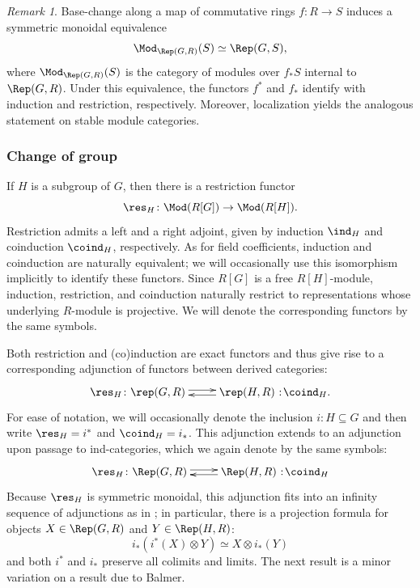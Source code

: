 \documentclass{amsart}%
\numberwithin{equation}{section}%
\theoremstyle{remark}
\newtheorem{Rem}[equation]{Remark}
\newcommand\noloc{%
  \nobreak
  \mspace{6mu plus 1mu}
  {:}
  \nonscript\mkern-\thinmuskip
  \mathpunct{}
  \mspace{2mu}
}
\begin{document}
\begin{Rem}\label{rem:etalecoeffbasechange}
Base-change along a map of commutative rings $f\colon R \to S$ induces a symmetric monoidal equivalence
\[
\Mod_{\Rep(G,R)}(S) \simeq \Rep(G,S),
\]
where $\Mod_{\Rep(G,R)}(S)$ is the category of modules over $f_*S$ internal to $\Rep(G,R)$. Under this equivalence, the functors $f^*$ and $f_*$ identify with induction and restriction, respectively. Moreover, localization yields the analogous statement on stable module categories. 
\end{Rem}


\subsubsection{Change of group}\label{ssec:changeofgroups}

If $H$ is a subgroup of $G$, then there is a restriction functor 
\[
\res_H\colon \Mod(R[G]) \to \Mod(R[H]).
\]
Restriction admits a left and a right adjoint, given by induction $\ind_H$ and coinduction $\coind_H$, respectively. As for field coefficients, induction and coinduction are naturally equivalent; we will occasionally use this isomorphism implicitly to identify these functors. Since $R[G]$ is a free $R[H]$-module, induction, restriction, and coinduction naturally restrict to representations whose underlying $R$-module is projective. We will denote the corresponding functors by the same symbols.

Both restriction and (co)induction are exact functors and thus give rise to a corresponding adjunction of functors between derived categories:
\[
\xymatrix{\res_H\colon \rep(G,R) \ar@<0.5ex>[r] & \rep(H,R)\noloc \coind_H. \ar@<0.5ex>[l]}
\]
For ease of notation, we will occasionally denote the inclusion $i\colon H \subseteq G$ and then write $\res_H = i^*$ and $\coind_H = i_*$. This adjunction extends to an adjunction upon passage to ind-categories, which we again denote by the same symbols:
\[
\xymatrix{\res_H\colon \Rep(G,R) \ar@<0.5ex>[r] & \Rep(H,R)\noloc \coind_H \ar@<0.5ex>[l]}
\]
Because $\res_H$ is symmetric monoidal, this adjunction fits into an infinity sequence of adjunctions as in \cite{BalmerDellAmbrogioSanders16}; in particular, there is a projection formula for objects $X \in \Rep(G,R)$ and $Y \in \Rep(H,R)$:
\begin{equation}\label{eq:projformula}
    i_*(i^*(X) \otimes Y) \simeq X \otimes i_*(Y)
\end{equation}
and both $i^*$ and $i_*$ preserve all colimits and limits. The next result is a minor variation on a result due to Balmer.
\end{document}
